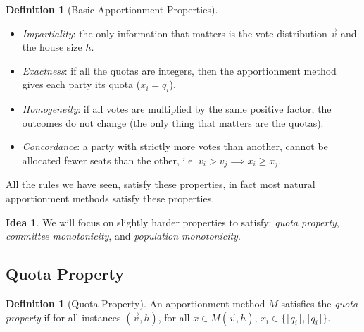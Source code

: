 \documentclass{book}
\theoremstyle{plain}
\theoremstyle{definition}
\newtheorem{definition}[theorem]{Definition}
\newtheorem{idea}[theorem]{Idea}
\theoremstyle{remark}
\begin{document}
\begin{definition}[Basic Apportionment Properties]
    \leavevmode \\
    \begin{itemize}
        \item \emph{Impartiality}: the only information that matters is the vote distribution $\vec{v}$ and the house size $h$.
        \item \emph{Exactness}: if all the quotas are integers, then 
        the apportionment method gives each party its quota ($x_i = q_i$).
        \item \emph{Homogeneity}: if all votes are multiplied by the same positive factor,
        the outcomes do not change (the only thing that matters are the quotas).
        \item \emph{Concordance}: a party with strictly more votes than another, 
        cannot be allocated fewer seats than the other, i.e. 
        $v_i > v_j \implies x_i \geq x_j$.
    \end{itemize}

    All the rules we have seen, satisfy these properties, in fact most natural 
    apportionment methods satisfy these properties.
\end{definition}

\begin{idea}
    We will focus on slightly harder 
    properties to satisfy:
    \emph{quota property}, \emph{committee monotonicity}, 
    and \emph{population monotonicity}.
\end{idea}

\subsection{Quota Property}

\begin{definition}[Quota Property]
    An apportionment method $M$ satisfies the
    \emph{quota property} if for all instances $(\vec{v}, h)$,
    for all $x \in M(\vec{v}, h)$, 
    $x_i \in \{\lfloor q_i \rfloor, \lceil q_i \rceil\}$.
\end{definition}
\end{document}
